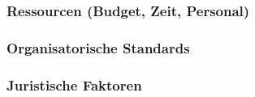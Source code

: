 
\subsubsection{Ressourcen (Budget, Zeit, Personal)}


\subsubsection{Organisatorische Standards}


\subsubsection{Juristische Faktoren}
  
